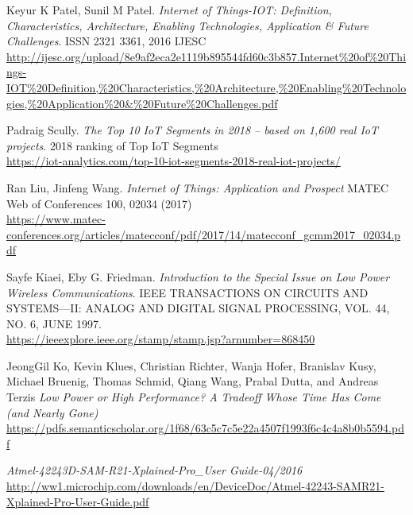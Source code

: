 \documentclass[12pt,a4paper]{report}
\begin{document}
\begin{thebibliography}{9}
Keyur K Patel, Sunil M Patel. 
\textit{Internet of Things-IOT: Definition, Characteristics, Architecture, Enabling Technologies, Application \& Future Challenges}.
ISSN 2321 3361, 2016 IJESC\\
\href{http://ijesc.org/upload/8e9af2eca2e1119b895544fd60c3b857.Internet\%20of\%20Things-IOT\%20Definition,\%20Characteristics,\%20Architecture,\%20Enabling\%20Technologies,\%20Application\%20\&\%20Future\%20Challenges.pdf}{http://ijesc.org/upload/8e9af2eca2e1119b895544fd60c3b857.Internet\%20of\%20Things-IOT\%20Definition,\%20Characteristics,\%20Architecture,\%20Enabling\%20Technologies,\%20Application\%20\&\%20Future\%20Challenges.pdf}

Padraig Scully.
\textit{The Top 10 IoT Segments in 2018 – based on 1,600 real IoT projects}. 
2018 ranking of Top IoT Segments\\
\href{https://iot-analytics.com/top-10-iot-segments-2018-real-iot-projects/}{https://iot-analytics.com/top-10-iot-segments-2018-real-iot-projects/}

Ran Liu, Jinfeng Wang.
\textit{Internet of Things: Application and Prospect }
MATEC Web of Conferences 100, 02034 (2017)\\
\href{https://www.matec-conferences.org/articles/matecconf/pdf/2017/14/matecconf\_gcmm2017\_02034.pdf}{https://www.matec-conferences.org/articles/matecconf/pdf/2017/14/matecconf\_gcmm2017\_02034.pdf}


Sayfe Kiaei, Eby G. Friedman.
\textit{Introduction to the Special Issue on Low Power Wireless Communications}.
IEEE TRANSACTIONS ON CIRCUITS AND SYSTEMS—II: ANALOG AND DIGITAL SIGNAL PROCESSING, VOL. 44, NO. 6, JUNE 1997.\\
\href{https://ieeexplore.ieee.org/stamp/stamp.jsp?arnumber=868450}{https://ieeexplore.ieee.org/stamp/stamp.jsp?arnumber=868450}

JeongGil Ko, Kevin Klues, Christian Richter, Wanja Hofer, Branislav Kusy, Michael Bruenig, Thomas Schmid, Qiang Wang, Prabal Dutta, and Andreas Terzis
\textit{Low Power or High Performance? A Tradeoff Whose Time Has Come (and Nearly Gone)}\\
\href{https://pdfs.semanticscholar.org/1f68/63c5c7c5e22a4507f1993f6c4c4a8b0b5594.pdf}{https://pdfs.semanticscholar.org/1f68/63c5c7c5e22a4507f1993f6c4c4a8b0b5594.pdf}

\textit{Atmel-42243D-SAM-R21-Xplained-Pro\_User Guide-04/2016}
\href{http://ww1.microchip.com/downloads/en/DeviceDoc/Atmel-42243-SAMR21-Xplained-Pro-User-Guide.pdf}{http://ww1.microchip.com/downloads/en/DeviceDoc/Atmel-42243-SAMR21-Xplained-Pro-User-Guide.pdf}


\end{thebibliography}
\end{document}
